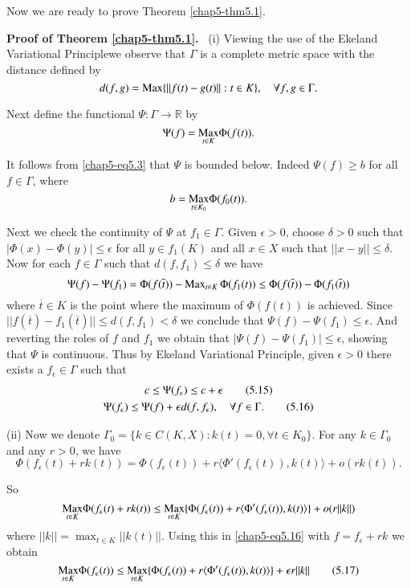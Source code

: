 Now we are ready to prove Theorem \ref{chap5-thm5.1}.

\medskip
\noindent
{\bf Proof of Theorem \ref{chap5-thm5.1}.}~ (i) Viewing the use of the
Ekeland Variational Principle\pageoriginale we observe that $\Gamma$
is a complete metric space with the distance defined by
$$
d(f,g)=\operatorname{Max}\{||f(t)-g(t)||:t\in K\},\quad \forall f,g\in \Gamma.
$$

Next define the functional $\Psi:\Gamma\to \mathbb{R}$ by
$$
\Psi(f)={\displaystyle{\mathop{\operatorname{Max}}_{t\in K}}}\Phi(f(t)).
$$

It follows from \eqref{chap5-eq5.3} that $\Psi$ is bounded
below. Indeed $\Psi(f)\geq b$ for all $f\in \Gamma$, where
$$
b={\displaystyle{\mathop{\operatorname{Max}}_{t\in K_{0}}}}\Phi(f_{0}(t)).
$$

Next we check the continuity of $\Psi$ at $f_{1}\in\Gamma$. Given
$\epsilon>0$, choose $\delta>0$ such that $|\Phi(x)-\Phi(y)|\leq
\epsilon$ for all $y\in f_{1}(K)$ and all $x\in X$ such that
$||x-y||\leq \delta$. Now for each $f\in \Gamma$ such that
$d(f,f_{1})\leq \delta$ we have
$$
\Psi(f)-\Psi(f_{1})=\Phi(f(\overline{t}))-\operatorname{Max}_{t\in
  K}\Phi(f_{1}(t))\leq \Phi(f(\overline{t}))-\Phi(f_{1}(\overline{t}))
$$
where $\overline{t}\in K$ is the point where the maximum of
$\Phi(f(t))$ is achieved. Since
$||f(\overline{t})-f_{1}(\overline{t})||\leq d(f,f_{1})<\delta$ we
conclude that $\Psi(f)-\Psi(f_{1})\leq \epsilon$. And reverting the
roles of $f$ and $f_{1}$ we obtain that $|\Psi(f)-\Psi(f_{1})|\leq
\epsilon$, showing that $\Psi$ is continuous. Thus by Ekeland
Variational Principle, given $\epsilon>0$ there exists a
$f_{\epsilon}\in \Gamma$ such that
\begin{gather*}
c\leq \Psi(f_{\epsilon})\leq
c+\epsilon\tag{5.15}\label{chap5-eq5.15}\\
\Psi(f_{\epsilon})\leq \Psi(f)+\epsilon d(f,f_{\epsilon}),\quad \forall
f\in\Gamma.\tag{5.16}\label{chap5-eq5.16} 
\end{gather*}

(ii) Now we denote $\Gamma_{0}=\{k\in C(K,X):k(t)=0, \forall t\in
K_{0}\}$. For any $k\in \Gamma_{0}$ and any $r>0$, we have
$$
\Phi(f_{\epsilon}(t)+rk(t))=\Phi(f_{\epsilon}(t))+r\langle
\Phi'(f_{\epsilon}(t)),k(t)\rangle+o(rk(t)). 
$$

So
$$
{\displaystyle{\mathop{\operatorname{Max}}_{t\in K}}}\Phi(f_{\epsilon}(t)+rk(t))\leq {\displaystyle{\mathop{\operatorname{Max}}_{t\in
  K}}}\{\Phi(f_{\epsilon}(t))+r\langle
\Phi'(f_{\epsilon}(t)),k(t)\rangle\}+o(r||k||) 
$$
where $||k||={\displaystyle{\mathop{\max}_{t\in K}}}||k(t)||$. Using this in
\eqref{chap5-eq5.16} with $f=f_{\epsilon}+rk$ we obtain
\begin{equation*}
{\displaystyle{\mathop{\operatorname{Max}}_{t\in K}}}\Phi(f_{\epsilon}(t))\leq {\displaystyle{\mathop{\operatorname{Max}}_{t\in
  K}}}\{\Phi(f_{\epsilon}(t))+r\langle
\Phi'(f_{\epsilon}(t)),k(t)\rangle\}+\epsilon
r||k||\tag{5.17}\label{chap5-eq5.17} 
\end{equation*}

